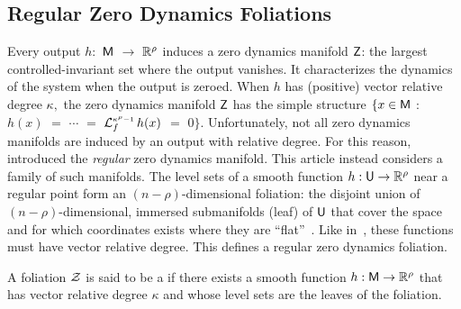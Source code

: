 \documentclass[a4paper]{ifacconf}
\begin{document}
\subsection{Regular Zero Dynamics Foliations}
Every output \(h:\) \(\mathsf{M}\) \(\to\) \(\mathbb{R}^\rho\) induces a zero dynamics manifold \(\mathsf{Z}\): the largest controlled-invariant set where the output vanishes.
It characterizes the dynamics of the system when the output is zeroed.
When \(h\) has (positive) vector relative degree \(\kappa,\) the zero dynamics manifold \(\mathsf{Z}\) has the simple structure \(\{x \in \mathsf{M}\) \(:\) \(h(x)\) \(=\) \(\cdots\) \(=\) \(\operatorname{\mathcal{L}}_{f}^{\smash{\scriptscriptstyle\kappa^{\rho}-1}} h(x)\) \(=\) \(0 \}.\)
Unfortunately, not all zero dynamics manifolds are induced by an output with relative degree.
For this reason,~\cite{dsouza_algorithm_2023} introduced the \emph{regular} zero dynamics manifold.
This article instead considers a family of such manifolds.
The level sets of a smooth function \(h: \mathsf{U} \to \mathbb{R}^\rho\) near a regular point form an \((n-\rho)\)-dimensional foliation:
the disjoint union of \((n-\rho)\)-dimensional, immersed submanifolds (leaf) of \(\mathsf{U}\) that cover the space and for which coordinates exists where they are ``flat''~\citep[pp. 501]{lee_introduction_2012}.
Like in~\cite{dsouza_algorithm_2023}, these functions must have vector relative degree.
This defines a regular zero dynamics foliation.
%
\begin{defn}%
  A foliation \(\mathcal{Z}\) is said to be a  if there exists a smooth function \(h: \mathsf{M} \to \mathbb{R}^\rho\) that has vector relative degree \(\kappa\) and whose level sets are the leaves of the foliation.
\end{defn}
\end{document}
